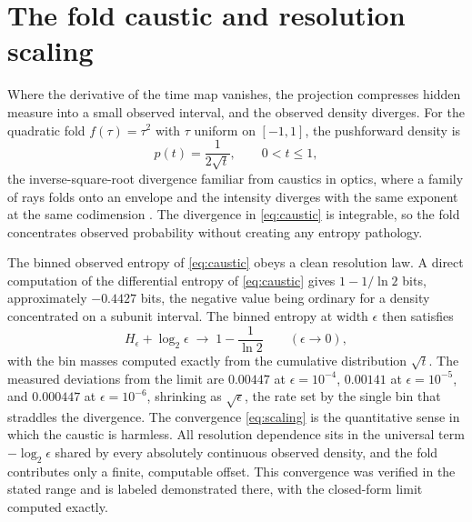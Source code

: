\documentclass[aps,pre,reprint,nofootinbib]{revtex4-2}
\begin{document}
\section{The fold caustic and resolution scaling}
\label{sec:caustic}

Where the derivative of the time map vanishes, the projection compresses
hidden measure into a small observed interval, and the observed density
diverges.  For the quadratic fold $f(\tau) = \tau^2$ with $\tau$ uniform on
$[-1, 1]$, the pushforward density is
\begin{equation}
  p(t) = \frac{1}{2\sqrt{t}}, \qquad 0 < t \le 1,
  \label{eq:caustic}
\end{equation}
the inverse-square-root divergence familiar from caustics in optics, where
a family of rays folds onto an envelope and the intensity diverges with the
same exponent at the same codimension \cite{BerryUpstill1980}.  The
divergence in \eqref{eq:caustic} is integrable, so the fold concentrates
observed probability without creating any entropy pathology.

The binned observed entropy of \eqref{eq:caustic} obeys a clean resolution
law.  A direct computation of the differential entropy of \eqref{eq:caustic}
gives $1 - 1/\ln 2$ bits, approximately $-0.4427$ bits, the negative value
being ordinary for a density concentrated on a subunit interval.  The
binned entropy at width $\epsilon$ then satisfies
\begin{equation}
  H_\epsilon + \log_2 \epsilon \;\longrightarrow\; 1 - \frac{1}{\ln 2}
  \qquad (\epsilon \to 0),
  \label{eq:scaling}
\end{equation}
with the bin masses computed exactly from the cumulative distribution
$\sqrt{t}$.  The measured deviations from the limit are $0.00447$ at
$\epsilon = 10^{-4}$, $0.00141$ at $\epsilon = 10^{-5}$, and $0.000447$ at
$\epsilon = 10^{-6}$, shrinking as $\sqrt{\epsilon}$, the rate set by the
single bin that straddles the divergence.  The convergence
\eqref{eq:scaling} is the quantitative sense in which the caustic is
harmless.  All resolution dependence sits in the universal term
$-\log_2 \epsilon$ shared by every absolutely continuous observed density,
and the fold contributes only a finite, computable offset.  This
convergence was verified in the stated range and is labeled demonstrated
there, with the closed-form limit computed exactly.
\end{document}

